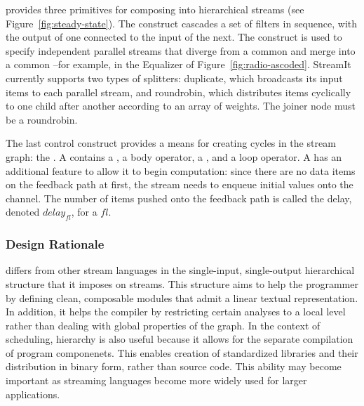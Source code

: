 

{\StreamIt} provides three primitives for composing {\filters} into
hierarchical streams (see Figure~\ref{fig:steady-state}).  The
{\pipeline} construct cascades a set of filters in sequence, with the
output of one connected to the input of the next.  The {\splitjoin}
construct is used to specify independent parallel streams that diverge
from a common {\splitter} and merge into a common {\joiner}--for
example, in the Equalizer of Figure~\ref{fig:radio-ascoded}.  StreamIt
currently supports two types of splitters: duplicate, which broadcasts
its input items to each parallel stream, and roundrobin, which
distributes items cyclically to one child after another according to
an array of weights.  The joiner node must be a roundrobin.

The last control construct provides a means for creating cycles in the
stream graph: the {\feedbackloop}. A {\feedbackloop} contains a
{\joiner}, a body operator, a {\splitter}, and a loop operator.  A
{\feedbackloop} has an additional feature to allow it to begin
computation: since there are no data items on the feedback path at
first, the stream needs to enqueue initial values onto the channel.
The number of items pushed onto the feedback path is called the delay,
denoted $delay_{fl}$, for a {\feedbackloop} $fl$.

\subsubsection{Design Rationale}

{\StreamIt} differs from other stream languages in the single-input,
single-output hierarchical structure that it imposes on streams.  This
structure aims to help the programmer by defining clean, composable
modules that admit a linear textual representation.  In addition, it
helps the compiler by restricting certain analyses to a local level
rather than dealing with global properties of the graph.  In the
context of scheduling, hierarchy is also useful because it allows for
the separate compilation of program componenets.  This enables
creation of standardized libraries and their distribution in binary
form, rather than source code.  This ability may become important as
streaming languages become more widely used for larger applications.

